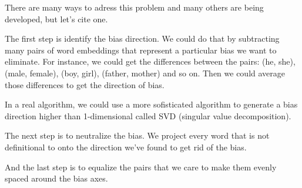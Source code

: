 \documentclass[12pt, a4paper, oneside]{book}
\begin{document}
There are many ways to adress this problem and many others are being developed,
but let's cite one.

The first step is identify the bias direction. We could do that by subtracting
many pairs of word embeddings that represent a particular bias we want to
eliminate. For instance, we could get the differences between the pairs: (he,
she), (male, female), (boy, girl), (father, mother) and so on. Then we could
average those differences to get the direction of bias.

\begin{obs}
In a real algorithm, we could use a more sofisticated algorithm to generate a
bias direction higher than 1-dimensional called SVD (singular value
decomposition).
\end{obs}

The next step is to neutralize the bias. We project every word that is not
definitional to onto the direction we've found to get rid of the bias.

And the last step is to equalize the pairs that we care to make them evenly
spaced around the bias axes.

\end{document}
